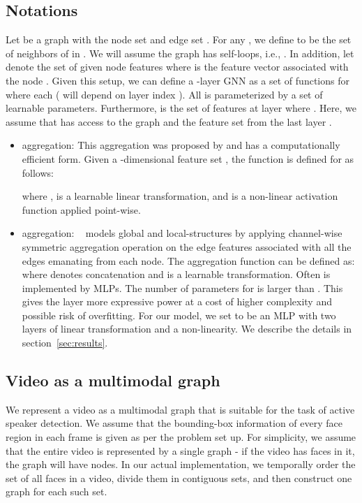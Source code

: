 \documentclass[runningheads]{llncs}
\begin{document}
\subsection{Notations}
\noindent
Let  be a graph with the node set  and edge set . For any , we define  to be the set of neighbors of  in . We will assume the graph has self-loops, i.e., . In addition, let  denote the set of given node features  where  is the feature vector associated with the node . Given this setup, we can define a -layer GNN as a set of functions  for  where each  (  will depend on layer index ). All   is parameterized by a set of learnable parameters. Furthermore,  is the set of features at layer  where . Here, we assume that  has access to the graph  and the feature set from the last layer . \begin{itemize}
    \item  aggregation:
    This aggregation was proposed by \cite{hamilton2017inductive} and has a computationally efficient form. Given a -dimensional feature set , the function  is defined for  as follows:
    
 where ,  is a learnable linear transformation, and  is a non-linear activation function applied point-wise. 
    
    \item  aggregation:
    ~\cite{wang2019dynamic} models global and local-structures by 
    applying channel-wise symmetric aggregation operation on the edge features associated with all the edges emanating from each node.
The aggregation function  can be defined as:
     where  denotes concatenation and  is a 
learnable transformation. Often  is implemented by MLPs. 
The number of parameters for  is larger than . This gives the  layer more expressive power at a cost of 
higher complexity
and possible risk of overfitting. For our model, we set  to be an MLP with two layers of linear transformation and a non-linearity. We describe the details in section~\ref{sec:results}.  


\end{itemize}

\subsection{Video as a multimodal graph} \label{sec:mmgraph}
\noindent
We represent a video as a multimodal graph that is suitable for the task of active speaker detection.
We assume that the bounding-box information of every face region in each frame is given as per the problem set up. 
For simplicity, we assume that the entire video is represented by a single graph - if the video has  faces in it, the graph will have  nodes. 
In our actual implementation, we temporally order the set of all faces in a video, divide them in contiguous sets, and then construct one graph for each such set.
\end{document}
